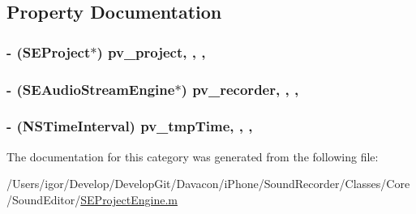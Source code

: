 \subsection{Property Documentation}
\hypertarget{category_s_e_project_engine_07_08_a410c495fb2444cb8f4bb502819f2f709}{
\subsubsection[{pv\-\_\-project}]{\setlength{\rightskip}{0pt plus 5cm}-\/ ({\bf S\-E\-Project}$\ast$) pv\-\_\-project\hspace{0.3cm}{\ttfamily [read]}, {\ttfamily [write]}, {\ttfamily [nonatomic]}, {\ttfamily [strong]}}}\label{category_s_e_project_engine_07_08_a410c495fb2444cb8f4bb502819f2f709}
\hypertarget{category_s_e_project_engine_07_08_af934c18203a994d10023f4ba3d694d5c}{
\subsubsection[{pv\-\_\-recorder}]{\setlength{\rightskip}{0pt plus 5cm}-\/ ({\bf S\-E\-Audio\-Stream\-Engine}$\ast$) pv\-\_\-recorder\hspace{0.3cm}{\ttfamily [read]}, {\ttfamily [write]}, {\ttfamily [nonatomic]}, {\ttfamily [strong]}}}\label{category_s_e_project_engine_07_08_af934c18203a994d10023f4ba3d694d5c}
\hypertarget{category_s_e_project_engine_07_08_ac43ef0758ea8bd82543c0af72588361f}{
\subsubsection[{pv\-\_\-tmp\-Time}]{\setlength{\rightskip}{0pt plus 5cm}-\/ (N\-S\-Time\-Interval) pv\-\_\-tmp\-Time\hspace{0.3cm}{\ttfamily [read]}, {\ttfamily [write]}, {\ttfamily [nonatomic]}, {\ttfamily [assign]}}}\label{category_s_e_project_engine_07_08_ac43ef0758ea8bd82543c0af72588361f}


The documentation for this category was generated from the following file\-:\begin{DoxyCompactItemize}
\item 
/\-Users/igor/\-Develop/\-Develop\-Git/\-Davacon/i\-Phone/\-Sound\-Recorder/\-Classes/\-Core/\-Sound\-Editor/\hyperlink{_s_e_project_engine_8m}{S\-E\-Project\-Engine.\-m}\end{DoxyCompactItemize}
